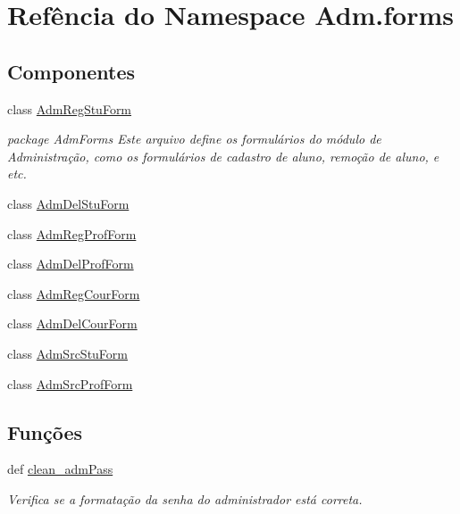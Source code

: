 \hypertarget{namespaceAdm_1_1forms}{\section{Refência do Namespace Adm.\-forms}
\label{namespaceAdm_1_1forms}
}
\subsection*{Componentes}
\begin{DoxyCompactItemize}
\item 
class \hyperlink{classAdm_1_1forms_1_1AdmRegStuForm}{Adm\-Reg\-Stu\-Form}
\begin{DoxyCompactList}\small\item\em package Adm\-Forms Este arquivo define os formulários do módulo de Administração, como os formulários de cadastro de aluno, remoção de aluno, e etc. \end{DoxyCompactList}\item 
class \hyperlink{classAdm_1_1forms_1_1AdmDelStuForm}{Adm\-Del\-Stu\-Form}
\item 
class \hyperlink{classAdm_1_1forms_1_1AdmRegProfForm}{Adm\-Reg\-Prof\-Form}
\item 
class \hyperlink{classAdm_1_1forms_1_1AdmDelProfForm}{Adm\-Del\-Prof\-Form}
\item 
class \hyperlink{classAdm_1_1forms_1_1AdmRegCourForm}{Adm\-Reg\-Cour\-Form}
\item 
class \hyperlink{classAdm_1_1forms_1_1AdmDelCourForm}{Adm\-Del\-Cour\-Form}
\item 
class \hyperlink{classAdm_1_1forms_1_1AdmSrcStuForm}{Adm\-Src\-Stu\-Form}
\item 
class \hyperlink{classAdm_1_1forms_1_1AdmSrcProfForm}{Adm\-Src\-Prof\-Form}
\end{DoxyCompactItemize}
\subsection*{Funções}
\begin{DoxyCompactItemize}
\item 
def \hyperlink{namespaceAdm_1_1forms_a24e20fddb6abcb82f01bad3bccb4d44e}{clean\-\_\-adm\-Pass}
\begin{DoxyCompactList}\small\item\em Verifica se a formatação da senha do administrador está correta. \end{DoxyCompactList}\end{DoxyCompactItemize}


